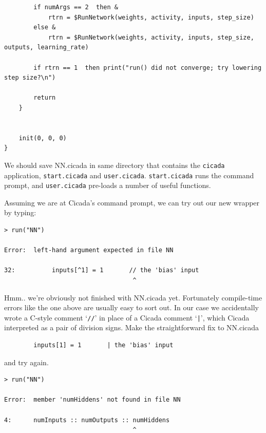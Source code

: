 \documentclass{article}
\newenvironment{code}{
       \begin{list}{}{
               \setlength{\leftmargin}{.4in}
               \setlength{\rightmargin}{0in}
               \setlength{\topsep}{.2in}
       }
       \small
       \item[] }
       { \end{list}   }
\newenvironment{longcode}{
       \begin{list}{}{
               \setlength{\leftmargin}{0in}
               \setlength{\rightmargin}{0in}
               \setlength{\topsep}{.2in}
       }
       \small
       \item[] }
       { \end{list}   }
\begin{document}
\begin{longcode}
\begin{verbatim}
        if numArgs == 2  then &
            rtrn = $RunNetwork(weights, activity, inputs, step_size)
        else &
            rtrn = $RunNetwork(weights, activity, inputs, step_size, outputs, learning_rate)
        
        if rtrn == 1  then print("run() did not converge; try lowering step size?\n")
        
        return
    }
    
    
    init(0, 0, 0)
}
\end{verbatim} \end{longcode}

\noindent We should save NN.cicada in same directory that contains the \verb#cicada# application, \verb#start.cicada# and \verb#user.cicada#.  \verb#start.cicada# runs the command prompt, and \verb#user.cicada# pre-loads a number of useful functions.

Assuming we are at Cicada's command prompt, we can try out our new wrapper by typing:

\begin{code} \begin{verbatim}
> run("NN")

Error:  left-hand argument expected in file NN

32:          inputs[^1] = 1       // the 'bias' input
                                   ^
\end{verbatim} \end{code}

\noindent Hmm..  we're obviously not finished with NN.cicada yet.  Fortunately compile-time errors like the one above are usually easy to sort out.  In our case we accidentally wrote a C-style comment `\verb#//#' in place of a Cicada comment `\verb#|#', which Cicada interpreted as a pair of division signs.  Make the straightforward fix to NN.cicada

\begin{code} \begin{verbatim}
        inputs[1] = 1       | the 'bias' input
\end{verbatim} \end{code}

\noindent and try again.

\begin{code} \begin{verbatim}
> run("NN")

Error:  member 'numHiddens' not found in file NN

4:      numInputs :: numOutputs :: numHiddens
                                   ^
\end{verbatim} \end{code}
\end{document}
